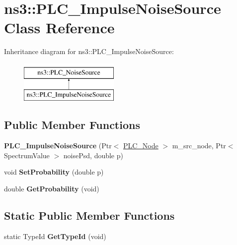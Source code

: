 \hypertarget{classns3_1_1PLC__ImpulseNoiseSource}{\section{ns3\-:\-:\-P\-L\-C\-\_\-\-Impulse\-Noise\-Source \-Class \-Reference}
\label{classns3_1_1PLC__ImpulseNoiseSource}
}
\-Inheritance diagram for ns3\-:\-:\-P\-L\-C\-\_\-\-Impulse\-Noise\-Source\-:\begin{figure}[H]
\begin{center}
\leavevmode
\includegraphics[height=2.000000cm]{classns3_1_1PLC__ImpulseNoiseSource}
\end{center}
\end{figure}
\subsection*{\-Public \-Member \-Functions}
\begin{DoxyCompactItemize}
\item 
\hypertarget{classns3_1_1PLC__ImpulseNoiseSource_a7027fcf2ad3cf9442e3207112cbb0f9b}{{\bfseries \-P\-L\-C\-\_\-\-Impulse\-Noise\-Source} (\-Ptr$<$ \hyperlink{classns3_1_1PLC__Node}{\-P\-L\-C\-\_\-\-Node} $>$ m\-\_\-src\-\_\-node, \-Ptr$<$ \-Spectrum\-Value $>$ noise\-Psd, double p)}\label{classns3_1_1PLC__ImpulseNoiseSource_a7027fcf2ad3cf9442e3207112cbb0f9b}

\item 
\hypertarget{classns3_1_1PLC__ImpulseNoiseSource_ad16655e5287e7144e8e02aa95fce0134}{void {\bfseries \-Set\-Probability} (double p)}\label{classns3_1_1PLC__ImpulseNoiseSource_ad16655e5287e7144e8e02aa95fce0134}

\item 
\hypertarget{classns3_1_1PLC__ImpulseNoiseSource_a8b5d15fb465aeaa71947e3e8f16567fc}{double {\bfseries \-Get\-Probability} (void)}\label{classns3_1_1PLC__ImpulseNoiseSource_a8b5d15fb465aeaa71947e3e8f16567fc}

\end{DoxyCompactItemize}
\subsection*{\-Static \-Public \-Member \-Functions}
\begin{DoxyCompactItemize}
\item 
\hypertarget{classns3_1_1PLC__ImpulseNoiseSource_a3bc892efc4cd33d4fc67f201b51bc3f9}{static \-Type\-Id {\bfseries \-Get\-Type\-Id} (void)}\label{classns3_1_1PLC__ImpulseNoiseSource_a3bc892efc4cd33d4fc67f201b51bc3f9}

\end{DoxyCompactItemize}
